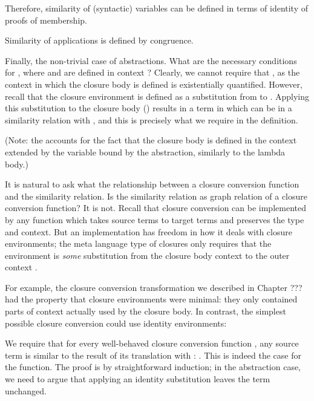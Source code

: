 \documentclass[bsc,frontabs,twoside,singlespacing,parskip,deptreport]{infthesis}
\theoremstyle{definition}
\begin{document}
Therefore, similarity of (syntactic) variables can be defined in terms
of identity of proofs of membership.

Similarity of applications is defined by congruence.

Finally, the non-trivial case of abstractions. What are the necessary
conditions for , where  and 
 are defined in context ? Clearly, we cannot require
that , as the context  in which the closure body is
defined is existentially quantified. However, recall that the closure environment
 is defined as a substitution from  to . Applying
this substitution to the closure body ()
results in a term in  which can be in a similarity relation with
, and this is precisely what we require in the definition.

(Note: the  accounts for the fact that the closure body is
defined in the context  extended by the variable bound by the
abstraction, similarly to the lambda body.)

It is natural to ask what the relationship between a closure
conversion function and the similarity relation. Is the similarity
relation as graph relation of a closure conversion function? It is
not. Recall that closure conversion can be implemented by any function
which takes source terms to target terms and preserves the type and
context. But an implementation has freedom in how it deals with
closure environments; the meta language type of closures only requires
that the environment is \textit{some} substitution from the closure
body context  to the outer context .

For example, the closure conversion transformation we described in
Chapter ??? had the property that closure environments were minimal:
they only contained parts of context actually used by the closure
body. In contrast, the simplest possible closure conversion could use
identity environments:


We require that for every well-behaved closure conversion function , any
source term  is similar to the result of its translation with
: . This is indeed the case for the 
function. The proof is by straightforward induction; in the
abstraction case, we need to argue that applying an identity substitution
leaves the term unchanged.
\end{document}
